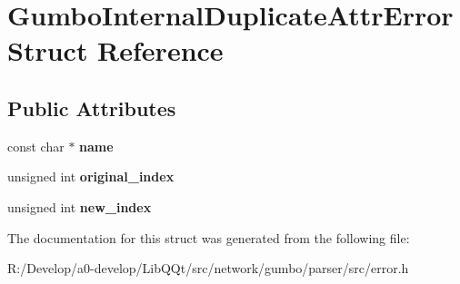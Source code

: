 \hypertarget{struct_gumbo_internal_duplicate_attr_error}{}\section{Gumbo\+Internal\+Duplicate\+Attr\+Error Struct Reference}
\label{struct_gumbo_internal_duplicate_attr_error}
\subsection*{Public Attributes}
\begin{DoxyCompactItemize}
\item 
\mbox{\label{struct_gumbo_internal_duplicate_attr_error_ac606e30a3848a0c7bca9c12e80cafb0d}} 
const char $\ast$ {\bfseries name}
\item 
\mbox{\label{struct_gumbo_internal_duplicate_attr_error_adf56a4349f63951fc5232c7959584a4d}} 
unsigned int {\bfseries original\+\_\+index}
\item 
\mbox{\label{struct_gumbo_internal_duplicate_attr_error_a037e7766eb26f9c375c61ad470259dce}} 
unsigned int {\bfseries new\+\_\+index}
\end{DoxyCompactItemize}


The documentation for this struct was generated from the following file\+:\begin{DoxyCompactItemize}
\item 
R\+:/\+Develop/a0-\/develop/\+Lib\+Q\+Qt/src/network/gumbo/parser/src/error.\+h\end{DoxyCompactItemize}
